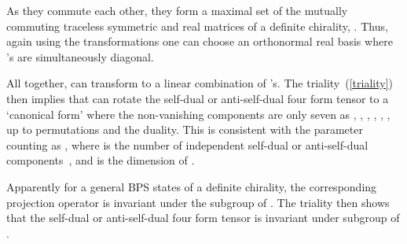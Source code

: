\documentclass[a4paper,11pt]{article}
\begin{document}
As they commute each other, they  form   a maximal set of the  mutually commuting  traceless  symmetric and real  matrices of a definite chirality,
\coordHE{}. Thus, again using the \coordHE{} transformations one can choose  an orthonormal real basis where \coordHE{}'s are simultaneously diagonal.




All together, \coordHE{} can transform \coordHE{} to a linear combination of \coordHE{}'s.  The \coordHE{} triality~(\ref{triality}) then
implies that \coordHE{} can rotate the self-dual or anti-self-dual four form tensor to a `canonical form' where the non-vanishing
components are only seven as \coordHE{}, \coordHE{}, \coordHE{}, \coordHE{}, \coordHE{}, \coordHE{}, \coordHE{} up to
permutations and the duality.  This is consistent with the parameter counting as \coordHE{}, where \coordHE{} is the number of independent self-dual or
anti-self-dual components \coordHE{}\,, and \coordHE{} is the dimension of \coordHE{}.





Apparently for a general \coordHE{} BPS states of a definite chirality, the corresponding projection operator \myHighlight{$\Omega_{\pm}$}\coordHE{} is invariant under the
\coordHE{} subgroup of \coordHE{}. The \coordHE{} triality then shows that the self-dual or
anti-self-dual four form tensor is invariant under \coordHE{} subgroup of \coordHE{}.\\
\end{document}
